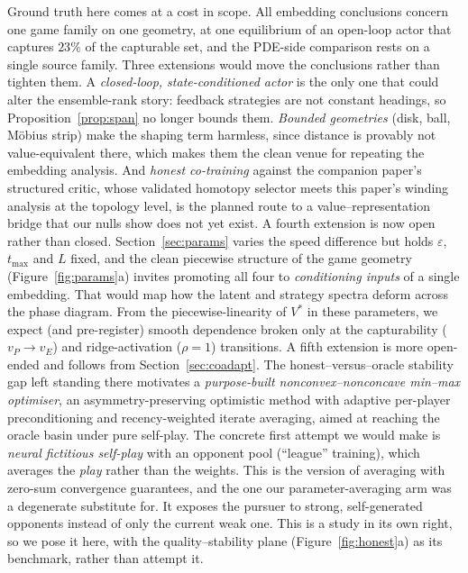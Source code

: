 \documentclass[twoside,11pt]{article}
\begin{document}
Ground truth here comes at a cost in scope.  All embedding conclusions
concern one game family on one geometry, at one equilibrium of an
open-loop actor that captures $23\%$ of the capturable set, and the
PDE-side comparison rests on a single source family.  Three extensions
would move the conclusions rather than tighten them.  A
\emph{closed-loop, state-conditioned actor} is the only one that could
alter the ensemble-rank story: feedback strategies are not constant
headings, so Proposition~\ref{prop:span} no longer bounds them.
\emph{Bounded geometries} (disk, ball, M\"obius strip) make the shaping
term harmless, since distance is provably not value-equivalent there,
which makes them the clean venue for repeating the embedding analysis.
And \emph{honest co-training} against the companion paper's structured
critic, whose validated homotopy selector meets this paper's winding
analysis at the topology level, is the planned route to a
value--representation bridge that our nulls show does not yet exist.  A
fourth extension is now open rather than closed.
Section~\ref{sec:params} varies the speed difference but holds
$\varepsilon$, $t_{\max}$ and $L$ fixed, and the clean piecewise
structure of the game geometry (Figure~\ref{fig:params}a) invites
promoting all four to \emph{conditioning inputs} of a single embedding.
That would map how the latent and strategy spectra deform across the
phase diagram.  From the piecewise-linearity of $V^{*}$ in these
parameters, we expect (and pre-register) smooth dependence broken only
at the capturability ($v_P \to v_E$) and ridge-activation
($\rho = 1$) transitions.  A fifth extension is more open-ended and
follows from Section~\ref{sec:coadapt}.  The honest--versus--oracle
stability gap left standing there motivates a \emph{purpose-built
nonconvex--nonconcave min--max optimiser}, an asymmetry-preserving
optimistic method with adaptive per-player preconditioning and
recency-weighted iterate averaging, aimed at reaching the oracle basin
under pure self-play.  The concrete first attempt we would make is
\emph{neural fictitious self-play} with an opponent pool (``league''
training), which averages the \emph{play} rather than the weights.
This is the version of averaging with zero-sum convergence guarantees,
and the one our parameter-averaging arm was a degenerate substitute
for.  It exposes the pursuer to strong, self-generated opponents
instead of only the current weak one.  This is a study in its own
right, so we pose it here, with the quality--stability plane
(Figure~\ref{fig:honest}a) as its benchmark, rather than attempt it.
\end{document}
